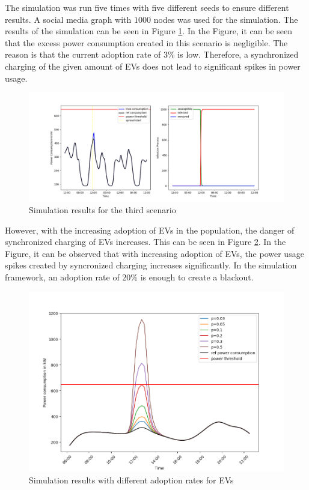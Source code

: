 The simulation was run five times with five 
different seeds to ensure different results. 
A social media graph with $1000$ nodes was used
for the simulation. The results of the simulation can be 
seen in Figure \ref{thirdscenarioresults}. In the Figure,
it can be seen that the excess power consumption created 
in this scenario is negligible. The reason is that the 
current adoption rate of $3\%$ is low. Therefore, a 
synchronized charging of the given amount of EVs does not
lead to significant spikes in power usage.

\begin{figure}[!ht]
    \center
    \includegraphics[scale=.5]{figs/eval/scenario3/scenario3basic.png}
    \caption{Simulation results for the third scenario}
    \label{thirdscenarioresults}
\end{figure}

However, with the increasing adoption of EVs in the 
population, the danger of synchronized charging 
of EVs increases. This can be seen in Figure 
\ref{thirdscenarioresultsdiffadoption}. In the Figure,
it can be observed that with increasing adoption of EVs,
the power usage spikes created by syncronized charging 
increases significantly. In the simulation framework,
an adoption rate of $20\%$ is enough to create a 
blackout.

\begin{figure}[!ht]
    \center
    \includegraphics[scale=.5]{figs/eval/scenario3/changingadoption.png}
    \caption{Simulation results with different adoption rates for EVs}
    \label{thirdscenarioresultsdiffadoption}
\end{figure}

